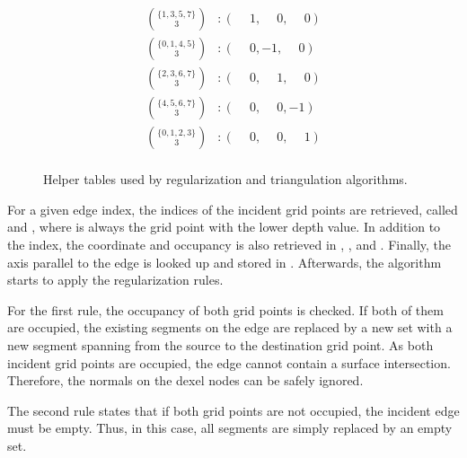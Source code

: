 \begin{figure}
\begin{subfigure}[t]{0.4\textwidth}
\begin{align*}
			\binom{\{1, 3, 5, 7\}}{3} &\colon (\phantom{-}1,\phantom{-}0,\phantom{-}0) \\
			\binom{\{0, 1, 4, 5\}}{3} &\colon (\phantom{-}0,         - 1,\phantom{-}0) \\
			\binom{\{2, 3, 6, 7\}}{3} &\colon (\phantom{-}0,\phantom{-}1,\phantom{-}0) \\
			\binom{\{4, 5, 6, 7\}}{3} &\colon (\phantom{-}0,\phantom{-}0,         - 1) \\
			\binom{\{0, 1, 2, 3\}}{3} &\colon (\phantom{-}0,\phantom{-}0,\phantom{-}1) \\
		\end{align*}
	\end{subfigure}
	\caption[Helper tables]{
		Helper tables used by regularization and triangulation algorithms.
	}
	\label{fig:tri_dexel_tables}
\end{figure}
%
For a given edge index, the indices of the incident grid points are retrieved, called  and , where  is always the grid point with the lower depth value.
In addition to the index, the coordinate and occupancy is also retrieved in , ,  and .
Finally, the axis parallel to the edge is looked up and stored in .
Afterwards, the algorithm starts to apply the regularization rules.

For the first rule, the occupancy of both grid points is checked.
If both of them are occupied, the existing segments on the edge are replaced by a new set with a new segment spanning from the source to the destination grid point.
As both incident grid points are occupied, the edge cannot contain a surface intersection.
Therefore, the normals on the dexel nodes can be safely ignored.

The second rule states that if both grid points are not occupied, the incident edge must be empty.
Thus, in this case, all segments are simply replaced by an empty set.


